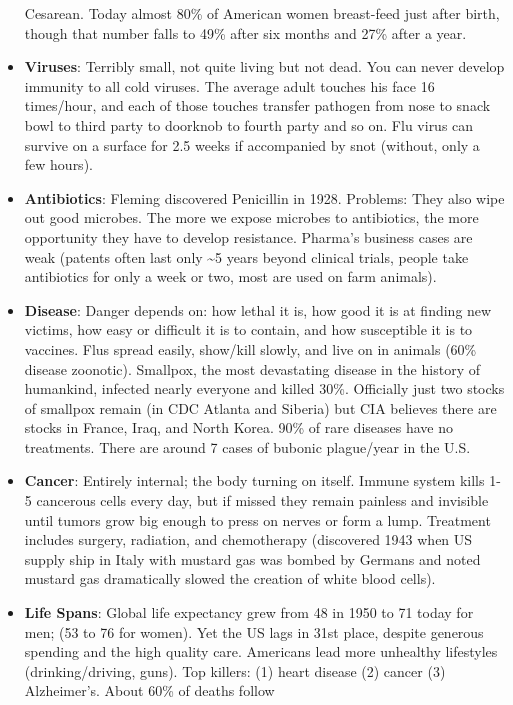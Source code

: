 \documentclass[
]{article}
\begin{document}
\begin{itemize}
  Cesarean. Today almost 80\% of American women breast-feed just after
  birth, though that number falls to 49\% after six months and 27\%
  after a year.
\item
  \textbf{Viruses}: Terribly small, not quite living but not dead. You
  can never develop immunity to all cold viruses. The average adult
  touches his face 16 times/hour, and each of those touches transfer
  pathogen from nose to snack bowl to third party to doorknob to fourth
  party and so on. Flu virus can survive on a surface for 2.5 weeks if
  accompanied by snot (without, only a few hours).
\item
  \textbf{Antibiotics}: Fleming discovered Penicillin in 1928. Problems:
  They also wipe out good microbes. The more we expose microbes to
  antibiotics, the more opportunity they have to develop resistance.
  Pharma's business cases are weak (patents often last only
  \textasciitilde5 years beyond clinical trials, people take antibiotics
  for only a week or two, most are used on farm animals).
\item
  \textbf{Disease}: Danger depends on: how lethal it is, how good it is
  at finding new victims, how easy or difficult it is to contain, and
  how susceptible it is to vaccines. Flus spread easily, show/kill
  slowly, and live on in animals (60\% disease zoonotic). Smallpox, the
  most devastating disease in the history of humankind, infected nearly
  everyone and killed 30\%. Officially just two stocks of smallpox
  remain (in CDC Atlanta and Siberia) but CIA believes there are stocks
  in France, Iraq, and North Korea. 90\% of rare diseases have no
  treatments. There are around 7 cases of bubonic plague/year in the
  U.S.
\item
  \textbf{Cancer}: Entirely internal; the body turning on itself. Immune
  system kills 1-5 cancerous cells every day, but if missed they remain
  painless and invisible until tumors grow big enough to press on nerves
  or form a lump. Treatment includes surgery, radiation, and
  chemotherapy (discovered 1943 when US supply ship in Italy with
  mustard gas was bombed by Germans and noted mustard gas dramatically
  slowed the creation of white blood cells).
\item
  \textbf{Life Spans}: Global life expectancy grew from 48 in 1950 to 71
  today for men; (53 to 76 for women). Yet the US lags in 31st place,
  despite generous spending and the high quality care. Americans lead
  more unhealthy lifestyles (drinking/driving, guns). Top killers: (1)
  heart disease (2) cancer (3) Alzheimer's. About 60\% of deaths follow

\end{itemize}
\end{document}
